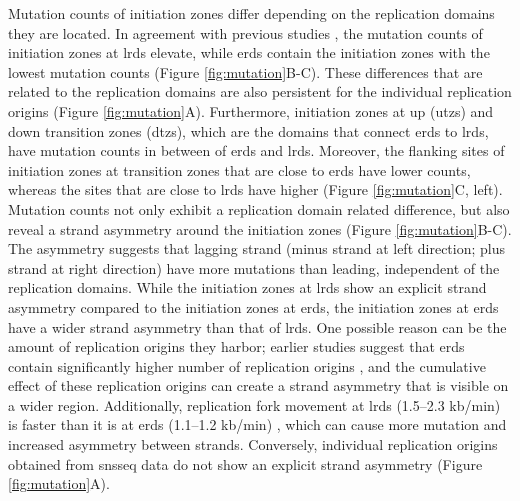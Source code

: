 Mutation counts of initiation zones differ depending on the replication domains they are located. In agreement with previous studies \citep{lawrence2013mutational,schuster2012chromatin,stamatoyannopoulos2009human}, the mutation counts of initiation zones at \gls{lrd}s elevate, while \gls{erd}s contain the initiation zones with the lowest mutation counts (Figure \ref{fig:mutation}B-C). These differences that are related to the replication domains are also persistent for the individual replication origins (Figure \ref{fig:mutation}A). Furthermore, initiation zones at up (\gls{utz}s) and down transition zones (\gls{dtz}s), which are the domains that connect \gls{erd}s to \gls{lrd}s, have mutation counts in between of \gls{erd}s and \gls{lrd}s. Moreover, the flanking sites of initiation zones at transition zones that are close to \gls{erd}s have lower counts, whereas the sites that are close to \gls{lrd}s have higher (Figure \ref{fig:mutation}C, left). 
Mutation counts not only exhibit a replication domain related difference, but also reveal a strand asymmetry around the initiation zones (Figure \ref{fig:mutation}B-C). The asymmetry suggests that lagging strand (minus strand at left direction; plus strand at right direction) have more mutations than leading, independent of the replication domains. While the initiation zones at \gls{lrd}s show an explicit strand asymmetry compared to the initiation zones at \gls{erd}s, the initiation zones at \gls{erd}s have a wider strand asymmetry than that of \gls{lrd}s. One possible reason can be the amount of replication origins they harbor; earlier studies suggest that \gls{erd}s contain significantly higher number of replication origins \citep{besnard2012unraveling}, and the cumulative effect of these replication origins can create a strand asymmetry that is visible on a wider region. Additionally, replication fork movement at \gls{lrd}s (1.5–2.3 kb/min) is faster than it is at \gls{erd}s (1.1–1.2 kb/min) \citep{takebayashi2005regulation}, which can cause more mutation and increased asymmetry between strands. Conversely, individual replication origins obtained from \gls{snsseq} data do not show an explicit strand asymmetry (Figure \ref{fig:mutation}A).


